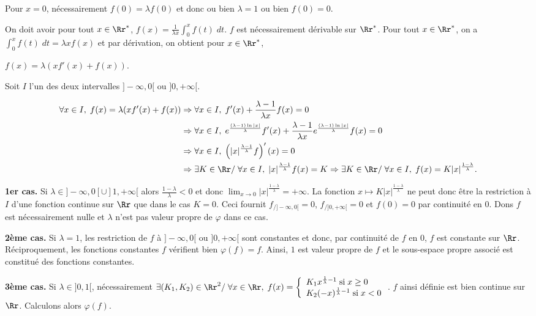 {\begin{enumerate}
{Pour $x = 0$, nécessairement $f(0) =\lambda f(0)$ et donc ou bien  $\lambda= 1$ ou bien $f(0) = 0$.

On doit avoir pour tout $x\in\Rr^*$, $f(x)=\frac{1}{\lambda x}\int_{0}^{x}f(t)\;dt$. $f$ est nécessairement dérivable sur $\Rr^*$. Pour tout $x\in\Rr^*$, on a $\int_{0}^{x}f(t)\;dt=\lambda xf(x)$ et par dérivation, on obtient pour $x\in\Rr^*$,

\begin{center}
$f(x) =\lambda(xf'(x)+f(x))$.
\end{center}

Soit $I$ l'un des deux intervalles $]-\infty,0[$ ou $]0,+\infty[$.

\begin{align*}\ensuremath
\forall x\in I,\;f(x) =\lambda(xf'(x)+f(x))&\Rightarrow\forall x\in I,\;f'(x)+\frac{\lambda-1}{\lambda x}f(x) = 0\\
 &\Rightarrow\forall x\in I,\;e^{\frac{(\lambda-1)\ln|x|}{\lambda}}f'(x)+\frac{\lambda-1}{\lambda x}e^{\frac{(\lambda-1)\ln|x|}{\lambda}}f(x) = 0\\
  &\Rightarrow\forall x\in I,\;\left(|x|^{\frac{\lambda-1}{\lambda}}f\right)'(x)=0\\
  &\Rightarrow\exists K\in\Rr/\;\forall x\in I,\;|x|^{\frac{\lambda-1}{\lambda}}f(x)=K\Rightarrow\exists K\in\Rr/\;\forall x\in I,\;f(x)=K|x|^{\frac{1-\lambda}{\lambda}}.
\end{align*}
				   

\textbf{1er cas.} Si $\lambda\in]-\infty,0[\cup]1,+\infty[$ alors $\frac{1-\lambda}{\lambda}< 0$ et donc $\lim_{x \rightarrow 0}|x|^{\frac{1-\lambda}{\lambda}}=+\infty$. La fonction $x\mapsto K|x|^{\frac{1-\lambda}{\lambda}}$ ne peut donc être la restriction à $I$ d'une fonction continue sur $\Rr$ que dans le cas $K = 0$. Ceci fournit $f_{/]-\infty,0[}= 0$, $f_{/]0,+\infty[}= 0$ et $f(0)=0$ par continuité en $0$. Dons $f$ est nécessairement nulle  et $\lambda$ n'est pas valeur propre de $\varphi$ dans ce cas.

\textbf{2ème cas.} Si $\lambda= 1$, les restriction de $f$ à $]-\infty,0[$ ou $]0,+\infty[$ sont constantes et donc, par continuité de $f$ en $0$, $f$ est constante sur $\Rr$. Réciproquement, les fonctions constantes $f$ vérifient bien $\varphi(f) = f$. Ainsi, $1$ est valeur propre de $f$ et le sous-espace propre associé est constitué des fonctions constantes.

\textbf{3ème cas.} Si $\lambda\in]0,1[$, nécessairement $\exists(K_1,K_2)\in\Rr^2/\;\forall x\in\Rr,\;f(x)=\left\{
\begin{array}{l}
K_1x^{\frac{1}{\lambda}-1}\;\text{si}\;x\geq0\\
K_2(-x)^{\frac{1}{\lambda}-1}\;\text{si}\;x < 0
\end{array}
\right.$. $f$ ainsi définie est bien continue sur $\Rr$. Calculons alors $\varphi(f)$.

}
\end{enumerate}}
